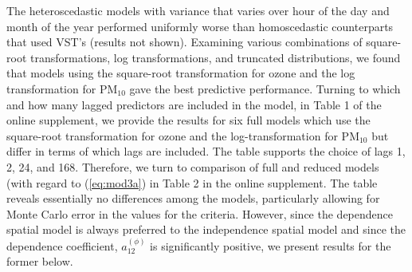 \documentclass[alpha-refs]{wiley-article}
\begin{document}
The heteroscedastic models with variance that varies over hour of the day and month of the year performed uniformly worse than homoscedastic counterparts that used VST's (results not shown). Examining various combinations of square-root transformations, log transformations, and truncated distributions, we found that models using the square-root transformation for ozone and the log transformation for $\text{PM}_{10}$ gave the best predictive performance. Turning to which and how many lagged predictors are included in the model, in Table 1 of the online supplement, we provide the results for six full models which use the square-root transformation for ozone and the log-transformation for $\text{PM}_{10}$ but differ in terms of which lags are included.  The table supports the choice of lags 1, 2, 24, and 168. Therefore, we turn to comparison of full and reduced models (with regard to (\ref{eq:mod3a}) in Table 2 in the online supplement. The table reveals essentially no differences among the models, particularly allowing for Monte Carlo error in the values for the criteria. However, since the dependence spatial model is always preferred to the independence spatial model and since the dependence coefficient, $a_{12}^{(\phi)}$ is significantly positive, we present results for the former below.



\end{document}
